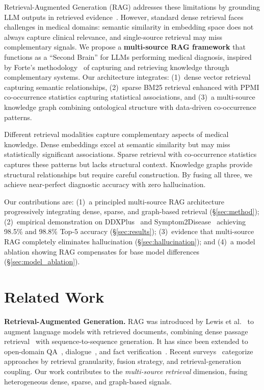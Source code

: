 \documentclass[preprint,12pt]{elsarticle}
\begin{document}
Retrieval-Augmented Generation (RAG) addresses these limitations by grounding LLM outputs in retrieved evidence~\cite{lewis2020retrieval,gao2023retrieval}. However, standard dense retrieval faces challenges in medical domains: semantic similarity in embedding space does not always capture clinical relevance, and single-source retrieval may miss complementary signals. We propose a \textbf{multi-source RAG framework} that functions as a ``Second Brain'' for LLMs performing medical diagnosis, inspired by Forte's methodology~\cite{forte2022building} of capturing and retrieving knowledge through complementary systems. Our architecture integrates: (1)~dense vector retrieval capturing semantic relationships, (2)~sparse BM25 retrieval enhanced with PPMI co-occurrence statistics capturing statistical associations, and (3)~a multi-source knowledge graph combining ontological structure with data-driven co-occurrence patterns.

Different retrieval modalities capture complementary aspects of medical knowledge. Dense embeddings excel at semantic similarity but may miss statistically significant associations. Sparse retrieval with co-occurrence statistics captures these patterns but lacks structural context. Knowledge graphs provide structural relationships but require careful construction. By fusing all three, we achieve near-perfect diagnostic accuracy with zero hallucination.

Our contributions are: (1)~a principled multi-source RAG architecture progressively integrating dense, sparse, and graph-based retrieval (\S\ref{sec:method}); (2)~empirical demonstration on DDXPlus~\cite{fansi2022ddxplus} and Symptom2Disease~\cite{gretelai_s2d} achieving 98.5\% and 98.8\% Top-5 accuracy (\S\ref{sec:results}); (3)~evidence that multi-source RAG completely eliminates hallucination (\S\ref{sec:hallucination}); and (4)~a model ablation showing RAG compensates for base model differences (\S\ref{sec:model_ablation}).

\section{Related Work}
\label{sec:related}

\textbf{Retrieval-Augmented Generation.} RAG was introduced by Lewis et al.~\cite{lewis2020retrieval} to augment language models with retrieved documents, combining dense passage retrieval~\cite{karpukhin2020dense} with sequence-to-sequence generation. It has since been extended to open-domain QA~\cite{izacard2021leveraging}, dialogue~\cite{shuster2021retrieval}, and fact verification~\cite{thorne2018fever}. Recent surveys~\cite{gao2023retrieval,zhao2024retrieval} categorize approaches by retrieval granularity, fusion strategy, and retrieval-generation coupling. Our work contributes to the \emph{multi-source retrieval} dimension, fusing heterogeneous dense, sparse, and graph-based signals.
\end{document}
